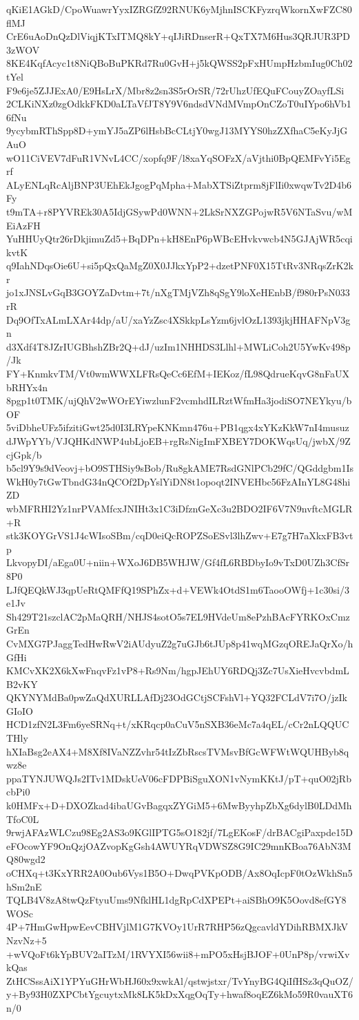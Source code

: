 qKiE1AGkD/CpoWuawrYyxIZRGfZ92RNUK6yMjhnISCKFyzrqWkornXwFZC80flMJ
CrE6uAoDnQzDlViqjKTxITMQ8kY+qIJiRDnserR+QxTX7M6Hus3QRJUR3PD3zWOV
8KE4KqfAcyc1t8NiQBoBuPKRd7Ru0GvH+j5kQWSS2pFxHUmpHzbmIug0Ch02tYel
F9e6je5ZJJExA0/E9HsLrX/Mbr8z2sn3S5rOrSR/72rUhzUfEQuFCouyZOayfLSi
2CLKiNXz0zgOdkkFKD0aLTaVfJT8Y9V6ndsdVNdMVmpOnCZoT0uIYpo6hVb16fNu
9ycybmRThSpp8D+ymYJ5aZP6lHsbBcCLtjY0wgJ13MYYS0hzZXfhaC5eKyJjGAuO
wO11CiVEV7dFuR1VNvL4CC/xopfq9F/l8xaYqSOFzX/aVjthi0BpQEMFvYi5Egrf
ALyENLqRcAljBNP3UEhEkJgogPqMpha+MabXTSiZtprm8jFlIi0xwqwTv2D4b6Fy
t9mTA+r8PYVREk30A5IdjGSywPd0WNN+2LkSrNXZGPojwR5V6NTaSvu/wMEiAzFH
YuHHUyQtr26rDkjimuZd5+BqDPn+kH8EnP6pWBcEHvkvwcb4N5GJAjWR5cqikvtK
q9IahNDqsOie6U+si5pQxQaMgZ0X0JJkxYpP2+dzetPNF0X15TtRv3NRqsZrK2kr
jo1xJNSLvGqB3GOYZaDvtm+7t/nXgTMjVZh8qSgY9loXeHEnbB/f980rPsN033rR
Dq9OfTxALmLXAr44dp/aU/xaYzZsc4XSkkpLsYzm6jvlOzL1393jkjHHAFNpV3gn
d3Xdf4T8JZrIUGBhshZBr2Q+dJ/uzIm1NHHDS3Llhl+MWLiCoh2U5YwKv498p/Jk
FY+KnmkvTM/Vt0wmWWXLFRsQeCc6EfM+IEKoz/fL98QdrueKqvG8nFaUXbRHYx4n
8pgp1t0TMK/ujQhV2wWOrEYiwzlunF2vcmhdILRztWfmHa3jodiSO7NEYkyu/bOF
5viDbheUFz5ifzitiGwt25d0I3LRYpeKNKmn476u+PB1qgx4xYKzKkW7nI4musuz
dJWpYYb/VJQHKdNWP4ubLjoEB+rgRsNigImFXBEY7DOKWqsUq/jwbX/9ZcjGpk/b
b5cl9Y9s9dVeovj+bO9STHSiy9sBob/Ru8gkAME7RsdGNlPCb29fC/QGddgbm1Is
WkH0y7tGwTbndG34nQCOf2DpYslYiDN8t1opoqt2INVEHbc56FzAInYL8G48hiZD
wbMFRHI2Yz1nrPVAMfcxJNIHt3x1C3iDfznGeXc3u2BDO2IF6V7N9nvftcMGLR+R
stk3KOYGrVS1J4cWIsoSBm/cqD0eiQcROPZSoESvl3lhZwv+E7g7H7aXkxFB3vtp
LkvopyDI/aEga0U+niin+WXoJ6DB5WHJW/Gf4fL6RBDbyIo9vTxD0UZh3CfSr8P0
LJfQEQkWJ3qpUeRtQMFfQ19SPhZx+d+VEWk4OtdS1m6TaooOWfj+1c30si/3e1Jv
Sh429T21szclAC2pMaQRH/NHJS4sotO5s7EL9HVdeUm8ePzhBAcFYRKOxCmzGrEn
CvMXG7PJaggTedHwRwV2iAUdyuZ2g7uGJb6tJUp8p41wqMGzqOREJaQrXo/hGfHi
KMCvXK2X6kXwFnqvFz1vP8+Rs9Nm/hgpJEhUY6RDQj3Zc7UsXieHvcvbdmLB2vKY
QKYNYMdBa0pwZaQdXURLLAfDj23OdGCtjSCFshVl+YQ32FCLdV7i7O/jzIkGIoIO
HCD1zfN2L3Fm6yeSRNq+t/xKRqcp0aCuV5nSXB36eMc7a4qEL/cCr2nLQQUCTHly
hXIaBsg2eAX4+M8Xf8IVaNZZvhr54tIzZbRscsTVMsvBfGcWFWtWQUHByb8qwz8e
ppaTYNJUWQJs2ITv1MDskUeV06cFDPBiSguXON1vNymKKtJ/pT+quO02jRbcbPi0
k0HMFx+D+DXOZkad4ibaUGvBagqxZYGiM5+6MwByyhpZbXg6dylB0LDdMhTfoC0L
9rwjAFAzWLCzu98Eg2AS3o9KGlIPTG5sO182jf/7LgEKosF/drBACgiPaxpde15D
eFOcowYF9OnQzjOAZvopKgGsh4AWUYRqVDWSZ8G9IC29mnKBoa76AbN3MQ80wgd2
oCHXq+t3KxYRR2A0Oub6Vys1B5O+DwqPVKpODB/Ax8OqIcpF0tOzWkhSn5hSm2nE
TQLB4V8zA8twQzFtyuUms9NfklHL1dgRpCdXPEPt+aiSBhO9K5Oovd8efGY8WOSc
4P+7HmGwHpwEevCBHVjlM1G7KVOy1UrR7RHP56zQgcavldYDihRBMXJkVNzvNz+5
+wVQoFt6kYpBUV2aITzM/1RVYXI56wii8+mPO5xHsjBJOF+0UnP8p/vrwiXvkQas
ZtHCSssAiX1YPYuGHrWbHJ60x9xwkAl/qstwjstxr/TvYnyBG4QiIfHSz3qQuOZ/
y+By93H0ZXPCbtYgcuytxMk8LK5kDxXqgOqTy+hwaf8oqEZ6kMo59R0vauXT6n/0
